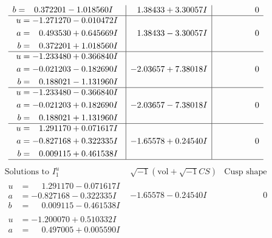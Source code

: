 \documentclass[1p]{elsarticle_modified}
\theoremstyle{definition}
\newcommand{\I}{\sqrt{-1}}
\begin{document}
$$\begin{array}{c|c|c}
\begin{aligned}
b &= \phantom{-}0.372201 - 1.018560 I\end{aligned}
 & \phantom{-}1.38433 + 3.30057 I & \phantom{-0.000000 } 0 \\ \hline\begin{aligned}
u &= -1.271270 - 0.010472 I \\
a &= \phantom{-}0.493530 + 0.645669 I \\
b &= \phantom{-}0.372201 + 1.018560 I\end{aligned}
 & \phantom{-}1.38433 - 3.30057 I & \phantom{-0.000000 } 0 \\ \hline\begin{aligned}
u &= -1.233480 + 0.366840 I \\
a &= -0.021203 - 0.182690 I \\
b &= \phantom{-}0.188021 - 1.131960 I\end{aligned}
 & -2.03657 + 7.38018 I & \phantom{-0.000000 } 0 \\ \hline\begin{aligned}
u &= -1.233480 - 0.366840 I \\
a &= -0.021203 + 0.182690 I \\
b &= \phantom{-}0.188021 + 1.131960 I\end{aligned}
 & -2.03657 - 7.38018 I & \phantom{-0.000000 } 0 \\ \hline\begin{aligned}
u &= \phantom{-}1.291170 + 0.071617 I \\
a &= -0.827168 + 0.322335 I \\
b &= \phantom{-}0.009115 + 0.461538 I\end{aligned}
 & -1.65578 + 0.24540 I & \phantom{-0.000000 } 0\\
 \hline 
 \end{array}$$\newpage$$\begin{array}{c|c|c}  
\text{Solutions to }I^u_{1}& \I (\text{vol} + \sqrt{-1}CS) & \text{Cusp shape}\\
 \hline 
\begin{aligned}
u &= \phantom{-}1.291170 - 0.071617 I \\
a &= -0.827168 - 0.322335 I \\
b &= \phantom{-}0.009115 - 0.461538 I\end{aligned}
 & -1.65578 - 0.24540 I & \phantom{-0.000000 } 0 \\ \hline\begin{aligned}
u &= -1.200070 + 0.510332 I \\
a &= \phantom{-}0.497005 + 0.005590 I \\

\end{aligned}
\end{array}$$
\end{document}
